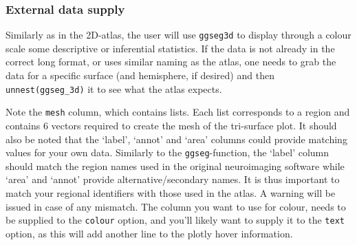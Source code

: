 \documentclass[fleqn,10pt]{wlpeerj} %
\newenvironment{Shaded}{\begin{snugshade}}{\end{snugshade}}
\newcommand{\CommentTok}[1]{\textcolor[rgb]{0.56,0.35,0.01}{\textit{#1}}}
\newcommand{\DecValTok}[1]{\textcolor[rgb]{0.00,0.00,0.81}{#1}}
\newcommand{\KeywordTok}[1]{\textcolor[rgb]{0.13,0.29,0.53}{\textbf{#1}}}
\newcommand{\NormalTok}[1]{#1}
\newcommand{\OperatorTok}[1]{\textcolor[rgb]{0.81,0.36,0.00}{\textbf{#1}}}
\newcommand{\StringTok}[1]{\textcolor[rgb]{0.31,0.60,0.02}{#1}}
\begin{document}
\normalsize

\hypertarget{external-data-supply}{%
\subsubsection{External data supply}\label{external-data-supply}}

Similarly as in the 2D-atlas, the user will use \texttt{ggseg3d} to display through a colour scale some descriptive or inferential statistics.
If the data is not already in the correct long format, or uses similar naming as the atlas, one needs to grab the data for a specific surface (and hemisphere, if desired) and then \texttt{unnest(ggseg\_3d)} it to see what the atlas expects.

\small

\begin{Shaded}
\end{Shaded}

\normalsize

Note the \texttt{mesh} column, which contains lists.
Each list corresponds to a region and contains 6 vectors required to create the mesh of the tri-surface plot.
It should also be noted that the `label', `annot' and `area' columns could provide matching values for your own data.
Similarly to the \texttt{ggseg}-function, the `label' column should match the region names used in the original neuroimaging software while `area' and `annot' provide alternative/secondary names.
It is thus important to match your regional identifiers with those used in the atlas.
A warning will be issued in case of any mismatch.
The column you want to use for colour, needs to be supplied to the \texttt{colour} option, and you'll likely want to supply it to the \texttt{text} option, as this will add another line to the plotly hover information.
\end{document}
